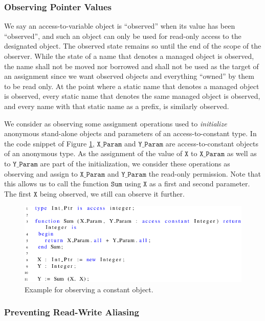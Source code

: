 \documentclass{llncs}
\newcommand\var[1]{\ensuremath{\mathtt{#1}}}
\begin{document}
\subsubsection{Observing Pointer Values}
\label{sec:observing}

We say an access-to-variable object is ``observed'' when its value has been ``observed'', and such an object can only be used for read-only access to the designated object.
The observed state remains so until the end of the scope of the observer. While the state of a name that denotes a managed object is observed, the name shall not be moved nor
borrowed and shall not be used as the target of an assignment since we want observed objects and everything ``owned'' by them to be read only. At the point where a static name
that denotes a managed object is observed, every static name that denotes the same managed object is observed, and every name with that static name as a prefix, is similarly observed. 

We consider as observing some assignment operations used to \textit{initialize} anonymous stand-alone objects and parameters of an access-to-constant type.
In the code snippet of Figure \ref{fig:observe_exp}, \var{X\_Param} and \var{Y\_Param} are access-to-constant objects of an anonymous type. As the assignment of the value of \var{X} to \var{X\_Param}
as well as to \var{Y\_Param} are part of the initialization, we consider these operations as observing and assign to \var{X\_Param} and \var{Y\_Param} the read-only permission. Note that
this allows us to call the function \var{Sum} using \var{X} as a first and second parameter. The first \var{X} being observed, we still can observe it further. 

\begin{figure}[htb!]
\centering
   \includegraphics[]{observe_ex1}
   \caption{Example for observing a constant object.}
   \label{fig:observe_exp}
\end{figure}

\subsubsection{Preventing Read-Write Aliasing}
\label{sec:noaliasing}
\end{document}
